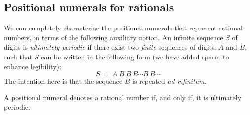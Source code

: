 
\subsection{Positional numerals for rationals}
\label{sec:special-numerals-Q}

We can completely characterize the positional numerals that represent
rational numbers, in terms of the following auxiliary notion.
An infinite sequence $S$ of digits is {\em ultimately periodic} if
there exist two {\em finite} sequences of digits, $A$ and $B$, such
that $S$ can be written in the following form (we have added spaces to
enhance legibility):
\begin{equation}
\label{eq:ult-per-seq}
 S \ = \ A \ B \ B \ B \cdots B \ B \cdots
\end{equation}
The intention here is that the sequence $B$ is repeated {\it ad
  infinitum}.


\begin{prop}
\label{thm:rational-real}
A positional numeral denotes a rational number if, and only if, it is
ultimately periodic.
\end{prop}

